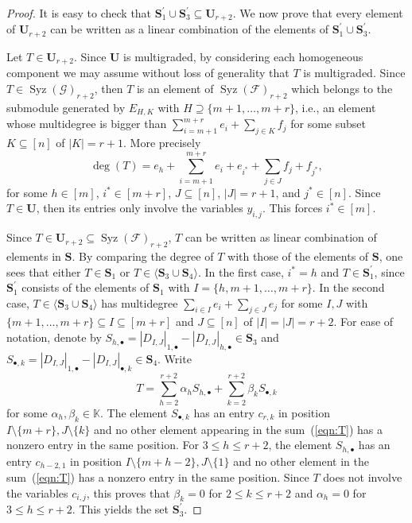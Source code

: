\documentclass[utf8,latin1]{article}
\DeclareMathOperator{\Syz}{Syz}
\begin{document}
\begin{proof}
It is easy to check that $\mathbf{S}^\prime_1\cup\mathbf{S}^\prime_3\subseteq\mathbf{U}_{r+2}$. We now prove that every element of $\mathbf{U}_{r+2}$ can be written as a linear combination of the elements of $\mathbf{S}^\prime_1\cup\mathbf{S}^\prime_3$.

Let $T\in\mathbf{U}_{r+2}$.
Since $\mathbf{U}$ is multigraded, by considering each homogeneous component we may assume without loss of generality that $T$ is multigraded.
Since $T\in\Syz(\mathcal{G})_{r+2}$, then $T$ is an element of $\Syz(\mathcal{F})_{r+2}$ which belongs to the submodule generated by $E_{H,K}$ with $H\supseteq\{m+1,\ldots,m+r\}$, i.e., an element whose multidegree is bigger than $\sum_{i=m+1}^{m+r} e_i+\sum_{j \in K} f_{j}$ for some subset $K\subseteq[n]$ of $|K|=r+1$. More precisely 
$$\deg(T)=e_h+\sum_{i=m+1}^{m+r} e_i + e_{i^*}+ \sum_{j \in J} f_{j}  + f_{j^{*}},$$
for some $h \in [m]$, $i^* \in [m+r]$, $J \subseteq [n]$, $|J|= r+1$, and $j^* \in [n]$.
Since $T\in\mathbf{U}$, then its entries only involve the variables $y_{i,j}$. This forces $i^* \in [m]$.

Since $T \in \mathbf{U}_{r+2}\subseteq \Syz(\mathcal{F})_{r+2}$, $T$ can be written as linear combination of elements in $\mathbf{S}$.
By comparing the degree of $T$ with those of the elements of $\mathbf{S}$, one sees that either $T\in\mathbf{S}_1$
or $T\in\langle\mathbf{S}_3\cup\mathbf{S}_4\rangle$.
In the first case, $i^*=h$ and $T\in\mathbf{S}^\prime_1$, since $\mathbf{S}^\prime_1$ consists of the elements of $\mathbf{S}_1$ with $I=\{h,m+1,\ldots,m+r\}$. In the second case,  $T\in\langle\mathbf{S}_3\cup\mathbf{S}_4\rangle$ has multidegree $\sum_{i\in I} e_{i}+\sum_{j\in J} e_{j}$ for some $I,J$ with $\{m+1,\ldots,m+r\}\subseteq I\subseteq [m+r]$ and $J\subseteq[n]$ of $|I|=|J|=r+2$. For ease of notation, denote by $S_{h,\bullet}=|D_{I,J}|_{1,\bullet}-|D_{I,J}|_{h,\bullet}\in\mathbf{S}_3$ and $S_{\bullet,k}=|D_{I,J}|_{1,\bullet} - |D_{I,J}|_{\bullet,k}\in\mathbf{S}_4$.
Write \begin{equation}\label{eqn:T}
T=\sum_{h=2}^{r+2}\alpha_h S_{h,\bullet}+\sum_{k=2}^{r+2}\beta_kS_{\bullet,k}
\end{equation} for some $\alpha_h,\beta_k\in\mathbb{K}$. 
The element $S_{\bullet,k}$ has an entry $c_{r,k}$ in position $I \setminus \{m+r\}, J\setminus \{k\}$ and no other element appearing in the sum~(\ref{eqn:T}) has a nonzero entry in the same position. For $3\leq h\leq r+2$, the element $S_{h,\bullet}$ has an entry $c_{h-2,1}$ in position $I\setminus \{m+h-2\}, J\setminus \{1\}$ and no other element in the sum~(\ref{eqn:T}) has a nonzero entry in the same position. Since $T$ does not involve the variables $c_{i,j}$, this proves that $\beta_k=0$ for $2\leq k\leq r+2$ and $\alpha_h=0$ for $3\leq h\leq r+2$. This yields the set $\mathbf{S}_3^\prime$. 
\end{proof}
\end{document}
